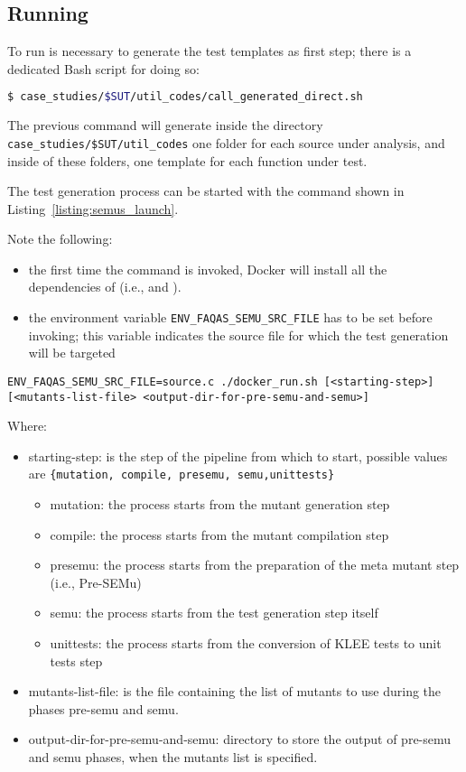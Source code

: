 \subsection{Running \SEMUS}
\label{sec:semuslaunch}

To run \SEMUS is necessary to generate the test templates as first step; there is a dedicated Bash script for doing so:

\begin{lstlisting}[language=bash]
 $ case_studies/$SUT/util_codes/call_generated_direct.sh
\end{lstlisting}

The previous command will generate inside the directory \texttt{case\_studies/\$SUT/util\_codes} one folder for each source under analysis, and inside of these folders, one template for each function under test.

The test generation process can be started with the command shown in Listing~\ref{listing:semus_launch}. 

Note the following:
\begin{itemize}
	\item the first time the command is invoked, Docker will install all the dependencies of \SEMUS (i.e., \SEMU and \MASS).
	\item the environment variable \texttt{ENV\_FAQAS\_SEMU\_SRC\_FILE} has to be set before invoking; this variable indicates the source file for which the test generation will be targeted
\end{itemize}

\begin{lstlisting}[language={}, label=listing:semus_launch]
ENV_FAQAS_SEMU_SRC_FILE=source.c ./docker_run.sh [<starting-step>] [<mutants-list-file> <output-dir-for-pre-semu-and-semu>]
\end{lstlisting}

Where:
\begin{itemize}
	\item starting-step: is the step of the pipeline from which to start, possible values are \texttt{\{mutation, compile, presemu, semu,unittests\}}
	\begin{itemize}
		\item mutation: the process starts from the mutant generation step
		\item compile: the process starts from the mutant compilation step
		\item presemu: the process starts from the preparation of the meta mutant step (i.e., Pre-SEMu)
		\item semu: the process starts from the test generation step itself
		\item unittests: the process starts from the conversion of KLEE tests to unit tests step
	\end{itemize}
	\item mutants-list-file: is the file containing the list of mutants to use during the phases pre-semu and semu.
	\item output-dir-for-pre-semu-and-semu: directory to store the output of pre-semu and semu phases, when the mutants list is specified.
\end{itemize}

